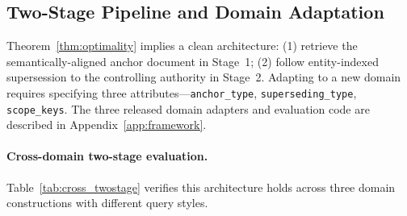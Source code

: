 \documentclass[11pt]{article}
\begin{document}
\subsection{Two-Stage Pipeline and Domain Adaptation}
\label{sec:framework}

Theorem~\ref{thm:optimality} implies a clean architecture: (1) retrieve the semantically-aligned anchor document in Stage~1; (2) follow entity-indexed supersession to the controlling authority in Stage~2. Adapting to a new domain requires specifying three attributes---\texttt{anchor\_type}, \texttt{superseding\_type}, \texttt{scope\_keys}. The three released domain adapters and evaluation code are described in Appendix~\ref{app:framework}.

\paragraph{Cross-domain two-stage evaluation.} Table~\ref{tab:cross_twostage} verifies this architecture holds across three domain constructions with different query styles.

\begin{table}[h]
\centering
\small
{}
\caption{Two-stage pipeline across three domain constructions and two query styles. BM25 direct always fails (TCA@5~$\approx$ 0). Two-Stage TCA@5 equals Stage-1 anchor Recall@5 when entity scope keys are unambiguous (Corollary~\ref{cor:identity}). $^\dagger$CVE+product-hint exception: product names are shared across CVEs, so product hints cause false anchor retrievals; free-form queries avoid this. Artifacts: \texttt{data/cve\_synthetic\_twostage\_results.json}, \texttt{data/legal\_twostage\_results.json}.}
\label{tab:cross_twostage}
\end{table}
\end{document}
